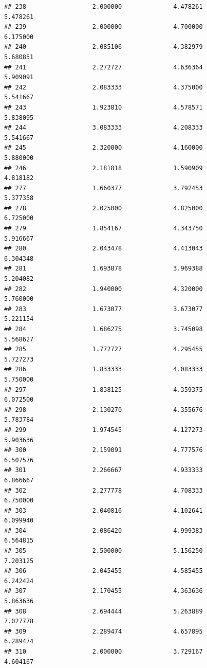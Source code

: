 \documentclass[]{article}
\begin{document}
\begin{verbatim}
## 238                  2.000000              4.478261                 5.478261
## 239                  2.000000              4.700000                 6.175000
## 240                  2.085106              4.382979                 5.680851
## 241                  2.272727              4.636364                 5.909091
## 242                  2.083333              4.375000                 5.541667
## 243                  1.923810              4.578571                 5.838095
## 244                  3.083333              4.208333                 5.541667
## 245                  2.320000              4.160000                 5.880000
## 246                  2.181818              1.590909                 4.818182
## 277                  1.660377              3.792453                 5.377358
## 278                  2.025000              4.825000                 6.725000
## 279                  1.854167              4.343750                 5.916667
## 280                  2.043478              4.413043                 6.304348
## 281                  1.693878              3.969388                 5.204082
## 282                  1.940000              4.320000                 5.760000
## 283                  1.673077              3.673077                 5.221154
## 284                  1.686275              3.745098                 5.568627
## 285                  1.772727              4.295455                 5.727273
## 286                  1.833333              4.083333                 5.750000
## 297                  1.838125              4.359375                 6.072500
## 298                  2.130270              4.355676                 5.783784
## 299                  1.974545              4.127273                 5.903636
## 300                  2.159091              4.777576                 6.507576
## 301                  2.266667              4.933333                 6.866667
## 302                  2.277778              4.708333                 6.750000
## 303                  2.040816              4.102641                 6.099940
## 304                  2.086420              4.999383                 6.564815
## 305                  2.500000              5.156250                 7.203125
## 306                  2.045455              4.585455                 6.242424
## 307                  2.170455              4.363636                 5.863636
## 308                  2.694444              5.263889                 7.027778
## 309                  2.289474              4.657895                 6.289474
## 310                  2.000000              3.729167                 4.604167

\end{verbatim}
\end{document}
